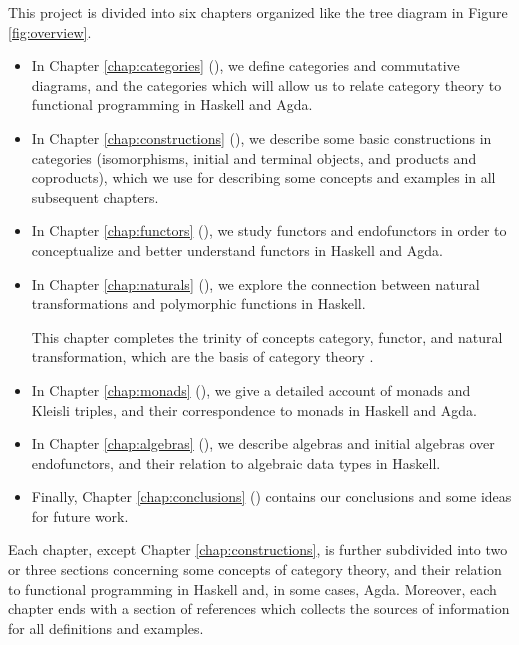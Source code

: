 This project is divided into six chapters organized like the tree
diagram in Figure \ref{fig:overview}.
\begin{itemize}
\item
  In Chapter \ref{chap:categories} (), we
  define categories and commutative diagrams, and the categories which
  will allow us to relate category theory to functional programming in
  Haskell and Agda.

\item
  In Chapter \ref{chap:constructions} (),
  we describe some basic constructions in categories (isomorphisms,
  initial and terminal objects, and products and coproducts), which we
  use for describing some concepts and examples in all subsequent
  chapters.

\item
  In Chapter \ref{chap:functors} (), we study
  functors and endofunctors in order to conceptualize and better
  understand functors in Haskell and Agda.

\item
  In Chapter \ref{chap:naturals} (), we explore
  the connection between natural transformations and polymorphic
  functions in Haskell.

  This chapter completes the trinity of concepts category, functor,
  and natural transformation, which are the basis of category theory
  \parencite[vii]{maclane-1998}.

\item
  In Chapter \ref{chap:monads} (), we give a
  detailed account of monads and Kleisli triples, and their
  correspondence to monads in Haskell and Agda.

\item
  In Chapter \ref{chap:algebras} (), we
  describe algebras and initial algebras over endofunctors, and their
  relation to algebraic data types in Haskell.

\item
  Finally, Chapter \ref{chap:conclusions} ()
  contains our conclusions and some ideas for future work.

\end{itemize}

Each chapter, except Chapter \ref{chap:constructions}, is further
subdivided into two or three sections concerning some concepts of
category theory, and their relation to functional programming in
Haskell and, in some cases, Agda. Moreover, each chapter ends with a
section of references which collects the sources of information for
all definitions and examples.

